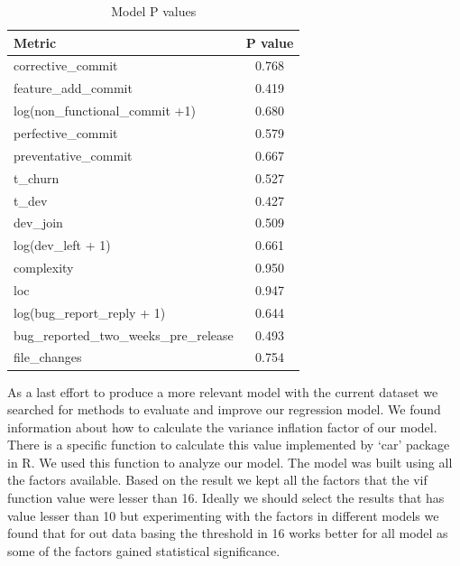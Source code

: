 \begin{table}[!hbt]
      \begin{center}
            \caption{Model P values}
            \label{tab:model_p_values}
            \begin{tabular}{l| c}
            \toprule
            \textbf{Metric}  & \textbf{P value} \\ \midrule                                         
            corrective\_commit                      &                     0.768 \\ 
            feature\_add\_commit                     &                    0.419 \\ 
            log(non\_functional\_commit +1)                  &            0.680 \\ 
            perfective\_commit                      &                     0.579 \\ 
            preventative\_commit                    &                     0.667 \\ 
            t\_churn                                &                     0.527 \\ 
            t\_dev                                  &                     0.427 \\ 
            dev\_join                               &                     0.509 \\ 
            log(dev\_left + 1)                               &            0.661 \\ 
            complexity                             &                      0.950 \\ 
            loc                                    &                      0.947 \\ 
            log(bug\_report\_reply + 1)                       &           0.644 \\ 
            bug\_reported\_two\_weeks\_pre\_release     &                 0.493 \\ 
            file\_changes                           &                     0.754 \\  \bottomrule
            \end{tabular}
      \end{center}
\end{table}

As a last effort to produce a more relevant model with the current dataset we searched for methods to evaluate and improve our regression model. We found information about how to calculate the variance inflation factor of our model. There is a specific function to calculate this value implemented by `car' package in R. We used this function to analyze our model. The model was built using all the factors available. Based on the result we kept all the factors that the vif function value were lesser than 16. Ideally we should select the results that has value lesser than 10 but experimenting with the factors in different models we found that for out data basing the threshold in 16 works better for all model as some of the factors gained statistical significance.


